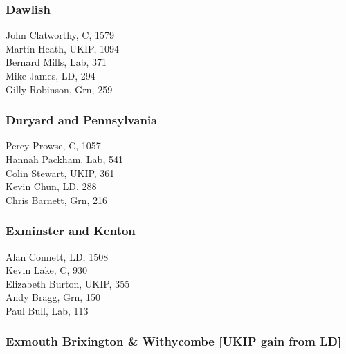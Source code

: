 \documentclass[a4paper,openany,10pt]{book}
\begin{document}
\subsubsection*{Dawlish}



John Clatworthy, C, 1579\\
Martin Heath, UKIP, 1094\\
Bernard Mills, Lab, 371\\
Mike James, LD, 294\\
Gilly Robinson, Grn, 259\\


\subsubsection*{Duryard and Pennsylvania}



Percy Prowse, C, 1057\\
Hannah Packham, Lab, 541\\
Colin Stewart, UKIP, 361\\
Kevin Chun, LD, 288\\
Chris Barnett, Grn, 216\\


\subsubsection*{Exminster and Kenton}



Alan Connett, LD, 1508\\
Kevin Lake, C, 930\\
Elizabeth Burton, UKIP, 355\\
Andy Bragg, Grn, 150\\
Paul Bull, Lab, 113\\


\subsubsection*{Exmouth Brixington \& Withycombe \hspace*{\fill}\nolinebreak[1]%
\enspace\hspace*{\fill}
[UKIP gain from LD]}

\end{document}
